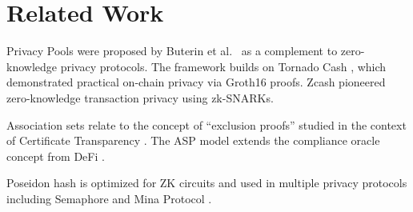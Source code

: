 \section{Related Work}
\label{sec:related}

Privacy Pools were proposed by Buterin et al.\ \cite{buterin2023privacy} as a complement to zero-knowledge privacy protocols. The framework builds on Tornado Cash \cite{pertsev2019tornado}, which demonstrated practical on-chain privacy via Groth16 proofs. Zcash \cite{hopwood2016zcash} pioneered zero-knowledge transaction privacy using zk-SNARKs.

Association sets relate to the concept of ``exclusion proofs'' studied in the context of Certificate Transparency \cite{laurie2013revocation}. The ASP model extends the compliance oracle concept from DeFi \cite{chainanalysis2023}.

Poseidon hash \cite{grassi2021poseidon} is optimized for ZK circuits and used in multiple privacy protocols including Semaphore \cite{semaphore2020} and Mina Protocol \cite{mina2020}.

